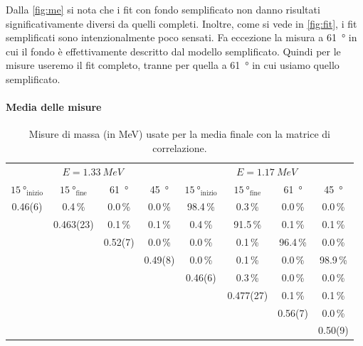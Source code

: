 Dalla \autoref{fig:me} si nota che i fit con fondo semplificato
non danno risultati significativamente diversi da quelli completi.
Inoltre, come si vede in \autoref{fig:fit},
i fit semplificati sono intenzionalmente poco sensati.
Fa eccezione la misura a \SI{61}{\degree}
in cui il fondo è effettivamente descritto dal modello semplificato.
Quindi per le misure useremo il fit completo,
tranne per quella a \SI{61}{\degree} in cui usiamo quello semplificato.

\paragraph{Media delle misure}

\begin{table}
	\centering
	\begin{tabular}{cccc|cccc}
		\toprule
		\multicolumn{4}{c|}{$E=\SI{1.33}{MeV}$} & \multicolumn{4}{c}{$E=\SI{1.17}{MeV}$} \\
		$\SI{15}{\degree}_\text{inizio}$ & $\SI{15}{\degree}_\text{fine}$ & \SI{61}{\degree} & \SI{45}{\degree} & $\SI{15}{\degree}_\text{inizio}$ & $\SI{15}{\degree}_\text{fine}$ & \SI{61}{\degree} & \SI{45}{\degree} \\
		\midrule
  0.46(6) &     0.4\,\% &    0.0\,\% &    0.0\,\%  &  98.4\,\% &     0.3\,\% &    0.0\,\%  &   0.0\,\% \\
          & 0.463(23) &    0.1\,\% &    0.1\,\%  &   0.4\,\% &    91.5\,\% &    0.1\,\%  &   0.1\,\% \\
          &           &  0.52(7) &    0.0\,\%  &   0.0\,\% &     0.1\,\% &   96.4\,\%  &   0.0\,\% \\
          &           &          &  0.49(8)  &   0.0\,\% &     0.1\,\% &    0.0\,\%  &  98.9\,\% \\
          &           &          &           & 0.46(6) &     0.3\,\% &    0.0\,\%  &   0.0\,\% \\
          &           &          &           &         & 0.477(27) &    0.1\,\%  &   0.1\,\% \\
          &           &          &           &         &           &  0.56(7)  &   0.0\,\% \\
          &           &          &           &         &           &           & 0.50(9) \\
		\bottomrule
	\end{tabular}
	\caption{\label{tab:cov}
	Misure di massa (in \si{MeV}) usate per la media finale con la matrice di correlazione.}
\end{table}

